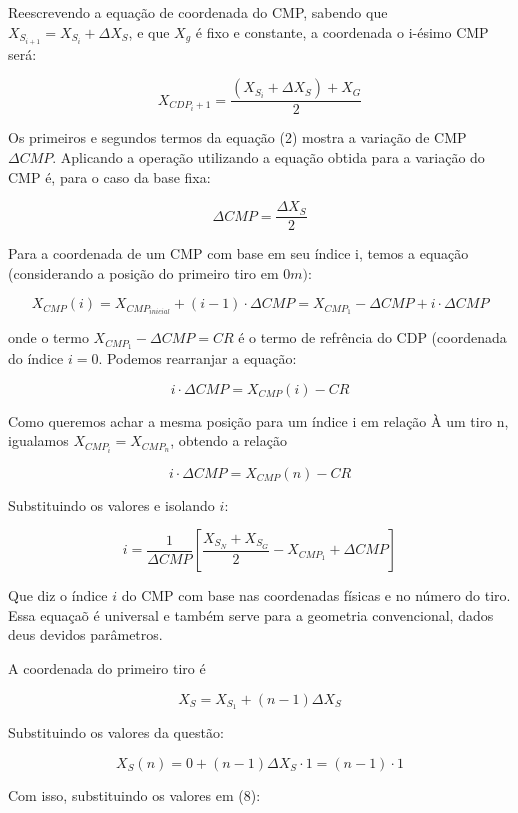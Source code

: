 \documentclass[12pt,a4paper]{article}
\begin{document}
Reescrevendo a equação de coordenada do CMP, sabendo que $X_{S_{i+1}} = X_{S_i} + \Delta X_S$, e que $X_g$ é fixo e constante, a coordenada o i-ésimo CMP será:

$$ X_{CDP_i+1} = \frac{(X_{S_i} + \Delta X_S) + X_G}{2}$$

Os primeiros e segundos termos da equação (2) mostra a variação de CMP $\Delta CMP$. Aplicando a operação utilizando a equação obtida para a variação do CMP é, para o caso da base fixa:

\begin{equation}
    \Delta CMP = \frac{\Delta X_S}{2}
\end{equation}



Para a coordenada de um CMP com base em seu índice i, temos a equação (considerando a posição do primeiro tiro em $0m)$:

$$ X_{CMP}(i) = X_{CMP_{inicial}} + (i-1)\cdot \Delta CMP = X_{CMP_1} - \Delta CMP + i\cdot \Delta CMP$$

\noindent
onde o termo $ X_{CMP_1} - \Delta CMP = CR$ é o termo de refrência do CDP (coordenada do índice $i=0$.  Podemos rearranjar a equação:

$$ i \cdot \Delta CMP = X_{CMP}(i) - CR$$

Como queremos achar a mesma posição para um índice i em relação À um tiro n, igualamos $X_{CMP_i} = X_{CMP_n}$, obtendo a relação 

$$i\cdot \Delta CMP = X_{CMP}(n) - CR$$

Substituindo os valores e isolando $i$:

\begin{equation}
    i = \frac{1}{\Delta CMP} [ \frac{X_{S_N} + X_{S_G}}{2} - X_{CMP_1} + \Delta CMP]
\end{equation}

Que diz o índice $i$ do CMP com base nas coordenadas físicas e no número do tiro. Essa equaçaõ é universal e também serve para a geometria convencional, dados deus devidos parâmetros. 


A coordenada do primeiro tiro é 

\begin{equation}
    X_S = X_{S_1} + (n-1) \Delta X_S
\end{equation}

Substituindo os valores da questão:

$$ X_S(n) = 0  + (n-1)\Delta X_S \cdot 1 = (n -1)\cdot 1 $$


Com isso, substituindo os valores em (8):
\end{document}
